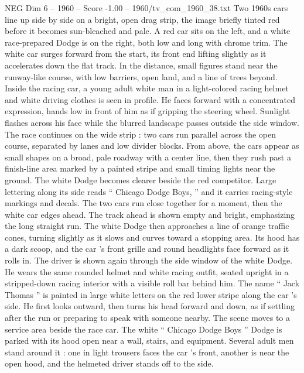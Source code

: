 \begin{textsample}{NEG Dim 6 – 1960 – Score -1.00 – 1960/tv\_com\_1960\_38.txt}  \label{ex:f6_neg_073}
Two 1960s cars line up side by side on a bright, open drag strip, the image briefly tinted red before it becomes sun-bleached and pale.
A red car sits on the left, and a white race-prepared Dodge is on the right, both low and long with chrome trim.
The white car surges forward from the start, its front end lifting slightly as it accelerates down the flat track.
In the distance, small figures stand near the runway-like course, with low barriers, open land, and a line of trees beyond.
Inside the racing car, a young adult white man in a light-colored racing helmet and white driving clothes is seen in profile.
He faces forward with a concentrated expression, hands low in front of him as if gripping the steering wheel.
Sunlight flashes across his face while the blurred landscape passes outside the side window.
The race continues on the wide strip : two cars run parallel across the open course, separated by lanes and low divider blocks.
From above, the cars appear as small shapes on a broad, pale roadway with a center line, then they rush past a finish-line area marked by a painted stripe and small timing lights near the ground.
The white Dodge becomes clearer beside the red competitor.
Large lettering along its side reads “ Chicago Dodge Boys, ” and it carries racing-style markings and decals.
The two cars run close together for a moment, then the white car edges ahead.
The track ahead is shown empty and bright, emphasizing the long straight run.
The white Dodge then approaches a line of orange traffic cones, turning slightly as it slows and curves toward a stopping area.
Its hood has a dark scoop, and the car ’s front grille and round headlights face forward as it rolls in.
The driver is shown again through the side window of the white Dodge.
He wears the same rounded helmet and white racing outfit, seated upright in a stripped-down racing interior with a visible roll bar behind him.
The name “ Jack Thomas ” is painted in large white letters on the red lower stripe along the car ’s side.
He first looks outward, then turns his head forward and down, as if settling after the run or preparing to speak with someone nearby.
The scene moves to a service area beside the race car.
The white “ Chicago Dodge Boys ” Dodge is parked with its hood open near a wall, stairs, and equipment.
Several adult men stand around it : one in light trousers faces the car ’s front, another is near the open hood, and the helmeted driver stands off to the side.

\end{textsample}
